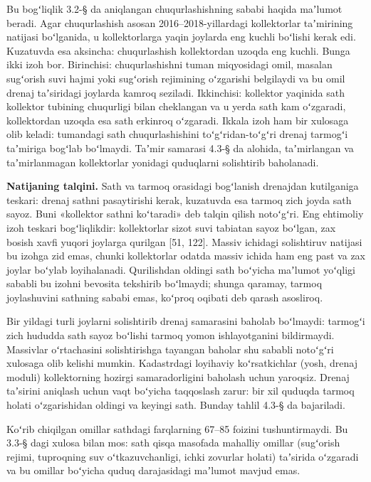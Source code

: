 Bu bogʻliqlik 3.2-§ da aniqlangan chuqurlashishning sababi haqida
maʼlumot beradi. Agar chuqurlashish asosan 2016--2018-yillardagi
kollektorlar taʼmirining natijasi boʻlganida, u kollektorlarga yaqin
joylarda eng kuchli boʻlishi kerak edi. Kuzatuvda esa aksincha:
chuqurlashish kollektordan uzoqda eng kuchli. Bunga ikki izoh bor.
Birinchisi: chuqurlashishni tuman miqyosidagi omil, masalan sugʻorish
suvi hajmi yoki sugʻorish rejimining oʻzgarishi belgilaydi va bu omil
drenaj taʼsiridagi joylarda kamroq seziladi. Ikkinchisi: kollektor
yaqinida sath kollektor tubining chuqurligi bilan cheklangan va u yerda
sath kam oʻzgaradi, kollektordan uzoqda esa sath erkinroq oʻzgaradi.
Ikkala izoh ham bir xulosaga olib keladi: tumandagi sath
chuqurlashishini toʻgʻridan-toʻgʻri drenaj tarmogʻi taʼmiriga bogʻlab
boʻlmaydi. Taʼmir samarasi 4.3-§ da alohida, taʼmirlangan va
taʼmirlanmagan kollektorlar yonidagi quduqlarni solishtirib baholanadi.

\textbf{Natijaning talqini.} Sath va tarmoq orasidagi bogʻlanish
drenajdan kutilganiga teskari: drenaj sathni pasaytirishi kerak,
kuzatuvda esa tarmoq zich joyda sath sayoz. Buni «kollektor sathni
koʻtaradi» deb talqin qilish notoʻgʻri. Eng ehtimoliy izoh teskari
bogʻliqlikdir: kollektorlar sizot suvi tabiatan sayoz boʻlgan, zax
bosish xavfi yuqori joylarga qurilgan {[}51, 122{]}. Massiv ichidagi
solishtiruv natijasi bu izohga zid emas, chunki kollektorlar odatda
massiv ichida ham eng past va zax joylar boʻylab loyihalanadi.
Qurilishdan oldingi sath boʻyicha maʼlumot yoʻqligi sababli bu izohni
bevosita tekshirib boʻlmaydi; shunga qaramay, tarmoq joylashuvini
sathning sababi emas, koʻproq oqibati deb qarash asosliroq.

Bir yildagi turli joylarni solishtirib drenaj samarasini baholab
boʻlmaydi: tarmogʻi zich hududda sath sayoz boʻlishi tarmoq yomon
ishlayotganini bildirmaydi. Massivlar oʻrtachasini solishtirishga
tayangan baholar shu sababli notoʻgʻri xulosaga olib kelishi mumkin.
Kadastrdagi loyihaviy koʻrsatkichlar (yosh, drenaj moduli) kollektorning
hozirgi samaradorligini baholash uchun yaroqsiz. Drenaj taʼsirini
aniqlash uchun vaqt boʻyicha taqqoslash zarur: bir xil quduqda tarmoq
holati oʻzgarishidan oldingi va keyingi sath. Bunday tahlil 4.3-§ da
bajariladi.

Koʻrib chiqilgan omillar sathdagi farqlarning 67--85 foizini
tushuntirmaydi. Bu 3.3-§ dagi xulosa bilan mos: sath qisqa masofada
mahalliy omillar (sugʻorish rejimi, tuproqning suv oʻtkazuvchanligi,
ichki zovurlar holati) taʼsirida oʻzgaradi va bu omillar boʻyicha quduq
darajasidagi maʼlumot mavjud emas.

